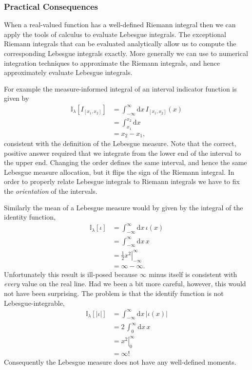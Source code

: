 \documentclass[
  letterpaper,
  DIV=11,
  numbers=noendperiod]{scrartcl}
\begin{document}
\hypertarget{practical-consequences-1}{%
\subsubsection{Practical Consequences}\label{practical-consequences-1}}

When a real-valued function has a well-defined Riemann integral then we
can apply the tools of calculus to evaluate Lebesgue integrals. The
exceptional Riemann integrals that can be evaluated analytically allow
us to compute the corresponding Lebesgue integrals exactly. More
generally we can use to numerical integration techniques to approximate
the Riemann integrals, and hence approximately evaluate Lebesgue
integrals.

For example the measure-informed integral of an interval indicator
function is given by \begin{align*}
\mathbb{I}_{\lambda}[I_{[x_{1}, x_{2}]}]
&=
\int_{-\infty}^{\infty} \mathrm{d} x \, I_{[x_{1}, x_{2}]}(x)
\\
&=
\int_{x_{1}}^{x_{2}} \mathrm{d} x
\\
&=
x_{2} - x_{1},
\end{align*} consistent with the definition of the Lebesgue measure.
Note that the correct, positive answer required that we integrate from
the lower end of the interval to the upper end. Changing the order
defines the same interval, and hence the same Lebesgue measure
allocation, but it flips the sign of the Riemann integral. In order to
properly relate Lebesgue integrals to Riemann integrals we have to fix
the \emph{orientation} of the intervals.

Similarly the mean of a Lebesgue measure would by given by the integral
of the identity function, \begin{align*}
\mathbb{I}_{\lambda}[\iota]
&=
\int_{-\infty}^{\infty} \mathrm{d} x \, \iota(x)
\\
&=
\int_{-\infty}^{\infty} \mathrm{d} x \, x
\\
&=
\left. \frac{1}{2} x^{2} \right|^{\infty}_{-\infty}
\\
&=
\infty - \infty.
\end{align*} Unfortunately this result is ill-posed because \(\infty\)
minus itself is consistent with \emph{every} value on the real line. Had
we been a bit more careful, however, this would not have been
surprising. The problem is that the identify function is not
Lebesgue-integrable, \begin{align*}
\mathbb{I}_{\lambda}[| \iota |]
&=
\int_{-\infty}^{\infty} \mathrm{d} x \, | \iota(x) |
\\
&=
2 \, \int_{0}^{\infty} \mathrm{d} x \, x
\\
&=
\left. x^{2} \right|^{\infty}_{0}
\\
&=
\infty!
\end{align*} Consequently the Lebesgue measure does not have any
well-defined moments.
\end{document}

